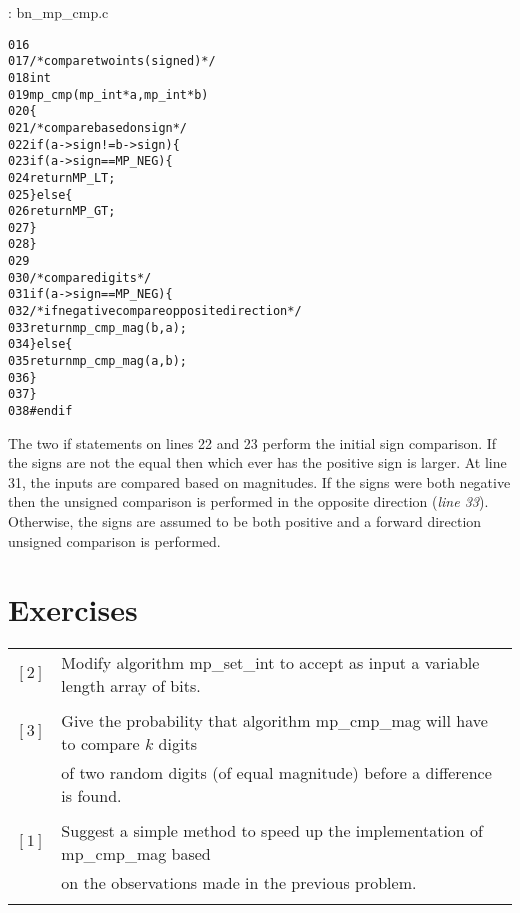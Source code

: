 \documentclass[b5paper]{book}
\begin{document}
\vspace{+3mm}\begin{small}
\hspace{-5.1mm}{\bf File}: bn\_mp\_cmp.c
\vspace{-3mm}
\begin{alltt}
016   
017   /* compare two ints (signed)*/
018   int
019   mp_cmp (mp_int * a, mp_int * b)
020   \{
021     /* compare based on sign */
022     if (a->sign != b->sign) \{
023        if (a->sign == MP_NEG) \{
024           return MP_LT;
025        \} else \{
026           return MP_GT;
027        \}
028     \}
029     
030     /* compare digits */
031     if (a->sign == MP_NEG) \{
032        /* if negative compare opposite direction */
033        return mp_cmp_mag(b, a);
034     \} else \{
035        return mp_cmp_mag(a, b);
036     \}
037   \}
038   #endif
\end{alltt}
\end{small}

The two if statements on lines 22 and 23 perform the initial sign comparison.  If the signs are not the equal then which ever
has the positive sign is larger.   At line 31, the inputs are compared based on magnitudes.  If the signs were both negative then 
the unsigned comparison is performed in the opposite direction (\textit{line 33}).  Otherwise, the signs are assumed to 
be both positive and a forward direction unsigned comparison is performed.

\section*{Exercises}
\begin{tabular}{cl}
$\left [ 2 \right ]$ & Modify algorithm mp\_set\_int to accept as input a variable length array of bits. \\
                     & \\
$\left [ 3 \right ]$ & Give the probability that algorithm mp\_cmp\_mag will have to compare $k$ digits  \\
                     & of two random digits (of equal magnitude) before a difference is found. \\
                     & \\
$\left [ 1 \right ]$ & Suggest a simple method to speed up the implementation of mp\_cmp\_mag based  \\
                     & on the observations made in the previous problem. \\
                     &
\end{tabular}
\end{document}
